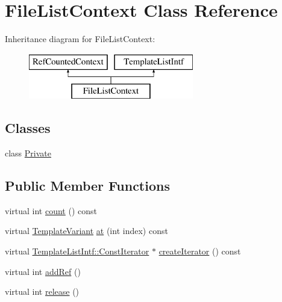 \hypertarget{class_file_list_context}{}\section{File\+List\+Context Class Reference}
\label{class_file_list_context}
Inheritance diagram for File\+List\+Context\+:\begin{figure}[H]
\begin{center}
\leavevmode
\includegraphics[height=2.000000cm]{class_file_list_context}
\end{center}
\end{figure}
\subsection*{Classes}
\begin{DoxyCompactItemize}
\item 
class \mbox{\hyperlink{class_file_list_context_1_1_private}{Private}}
\end{DoxyCompactItemize}
\subsection*{Public Member Functions}
\begin{DoxyCompactItemize}
\item 
virtual int \mbox{\hyperlink{class_file_list_context_a0394f04efdefc36ab71bc5608db94644}{count}} () const
\item 
virtual \mbox{\hyperlink{class_template_variant}{Template\+Variant}} \mbox{\hyperlink{class_file_list_context_ab0a889fd2011e3fbafc3271cd1d4c20f}{at}} (int index) const
\item 
virtual \mbox{\hyperlink{class_template_list_intf_1_1_const_iterator}{Template\+List\+Intf\+::\+Const\+Iterator}} $\ast$ \mbox{\hyperlink{class_file_list_context_a242d626e27147b2f7a07bc2c27417a4f}{create\+Iterator}} () const
\item 
virtual int \mbox{\hyperlink{class_file_list_context_a8b193daaaccb88cee19db52c368d727a}{add\+Ref}} ()
\item 
virtual int \mbox{\hyperlink{class_file_list_context_a757f759e1158e2c2859cb86b483fcd51}{release}} ()
\end{DoxyCompactItemize}
